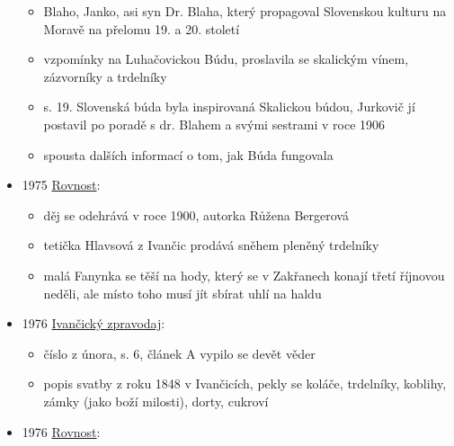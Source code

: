 \begin{itemize}
  \begin{itemize}
  \tightlist
  \item
    Blaho, Janko, asi syn Dr. Blaha, který propagoval Slovenskou kulturu
    na Moravě na přelomu 19. a 20. století
  \item
    vzpomínky na Luhačovickou Búdu, proslavila se skalickým vínem,
    zázvorníky a trdelníky
  \item
    s. 19. Slovenská búda byla inspirovaná Skalickou búdou, Jurkovič jí
    postavil po poradě s dr. Blahem a svými sestrami v roce 1906
  \item
    spousta dalších informací o tom, jak Búda fungovala
  \end{itemize}
\item
  1975
  \href{https://ceskadigitalniknihovna.cz/view/uuid:b23f9410-20b3-11ee-a8bd-005056827e51?page=uuid\%3A00d297d0-20cd-11ee-9137-005056822549&fulltext=trdeln\%C3\%ADk\%20OR\%20trdeln\%C3\%ADky\%20OR\%20trdeln\%C3\%ADk\%C5\%AF&source=mzk}{Rovnost}:

  \begin{itemize}
  \tightlist
  \item
    děj se odehrává v roce 1900, autorka Růžena Bergerová
  \item
    tetička Hlavsová z Ivančic prodává sněhem pleněný trdelníky
  \item
    malá Fanynka se těší na hody, který se v Zakřanech konají třetí
    říjnovou neděli, ale místo toho musí jít sbírat uhlí na haldu
  \end{itemize}
\item
  1976
  \href{https://ceskadigitalniknihovna.cz/view/uuid:ed1e8590-5937-11e2-b816-001018b5eb5c?page=uuid:42702f2d-2ffb-ed27-fb9d-4071dce2a1d8&fulltext=trdeln\%C3\%ADk\%20OR\%20trdeln\%C3\%ADky\%20OR\%20trdeln\%C3\%ADku\%20&source=mzk}{Ivančický
  zpravodaj}:

  \begin{itemize}
  \tightlist
  \item
    číslo z února, s. 6, článek A vypilo se devět věder
  \item
    popis svatby z roku 1848 v Ivančicích, pekly se koláče, trdelníky,
    koblihy, zámky (jako boží milosti), dorty, cukroví
  \end{itemize}
\item
  1976
  \href{https://ceskadigitalniknihovna.cz/view/uuid:c28d9bc0-d57e-11ee-8ea1-5ef3fc9bb22f?page=uuid\%3A97237c77-34d2-4422-98b3-6d767baeb2bd&fulltext=trdeln\%C3\%ADk\%20OR\%20trdeln\%C3\%ADky\%20OR\%20trdeln\%C3\%ADk\%C5\%AF&source=mzk}{Rovnost}:


\end{itemize}
